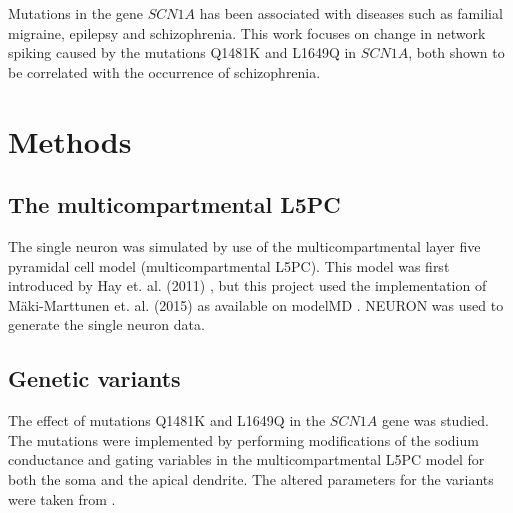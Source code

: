 \documentclass[twocolumn, a4paper,10pt, norsk]{scrartcl}
\begin{document}

Mutations in the gene $SCN1A$ has been associated with diseases such as familial migraine, epilepsy and schizophrenia. This work focuses on change in network spiking caused by the mutations Q1481K and L1649Q in $SCN1A$, both shown to be correlated with the occurrence of schizophrenia. %







\section*{Methods}
\subsection*{The multicompartmental L5PC}
The single neuron was simulated by use of the multicompartmental layer five pyramidal cell model (multicompartmental L5PC). This model was first introduced by Hay et. al. (2011) \cite{l5pc_model}, but this project used the implementation of M\"aki-Marttunen et. al. (2015)\cite{gautes} as available on modelMD \cite{L5PC_Tuomo_modelMD}. NEURON was used to generate the single neuron data.

\subsection*{Genetic variants}
The effect of mutations Q1481K and L1649Q in the $SCN1A$ gene was studied. The mutations were implemented by performing modifications of the sodium conductance and gating variables in the multicompartmental L5PC model for both the soma and the apical dendrite. %
The altered parameters for the variants were taken from \cite{gautes}. %
\end{document}
